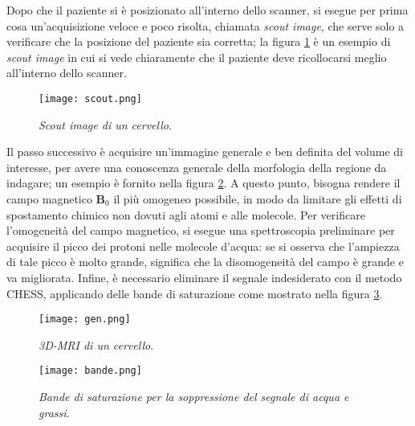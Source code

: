 \documentclass{report}
\newcommand{\figref}[1]{figura \ref{#1}}
\numberwithin{equation}{section}
\numberwithin{figure}{section}
\renewcommand{\Vec}{\bm}
\begin{document}
Dopo che il paziente si è posizionato all'interno dello scanner, si esegue per prima cosa un'acquisizione veloce e poco risolta, chiamata \textit{scout image}, che serve solo a verificare che la posizione del paziente sia corretta; la \figref{fig:scout} è un esempio di \textit{scout image} in cui si vede chiaramente che il paziente deve ricollocarsi meglio all'interno dello scanner.

\begin{figure}[htp]
\centering
\texttt{[image: scout.png]}
\caption{\label{fig:scout} \textit{Scout image di un cervello}.}
\end{figure}

Il passo successivo è acquisire un'immagine generale e ben definita del volume di interesse, per avere una conoscenza generale della morfologia della regione da indagare; un esempio è fornito nella \figref{fig:gen}. A questo punto, bisogna rendere il campo magnetico $\Vec{B}_0$ il più omogeneo possibile, in modo da limitare gli effetti di spostamento chimico non dovuti agli atomi e alle molecole. Per verificare l'omogeneità del campo magnetico, si esegue una spettroscopia preliminare per acquisire il picco dei protoni nelle molecole d'acqua: se si osserva che l'ampiezza di tale picco è molto grande, significa che la disomogeneità del campo è grande e va migliorata. Infine, è necessario eliminare il segnale indesiderato con il metodo CHESS, applicando delle bande di saturazione come mostrato nella \figref{fig:bande}.

\begin{figure}[htp]
\centering
\texttt{[image: gen.png]}
\caption{\label{fig:gen} \textit{3D-MRI di un cervello}.}
\end{figure}

\begin{figure}[htp]
\centering
\texttt{[image: bande.png]}
\caption{\label{fig:bande} \textit{Bande di saturazione per la soppressione del segnale di acqua e grassi}.}
\end{figure}

\newpage
\end{document}

